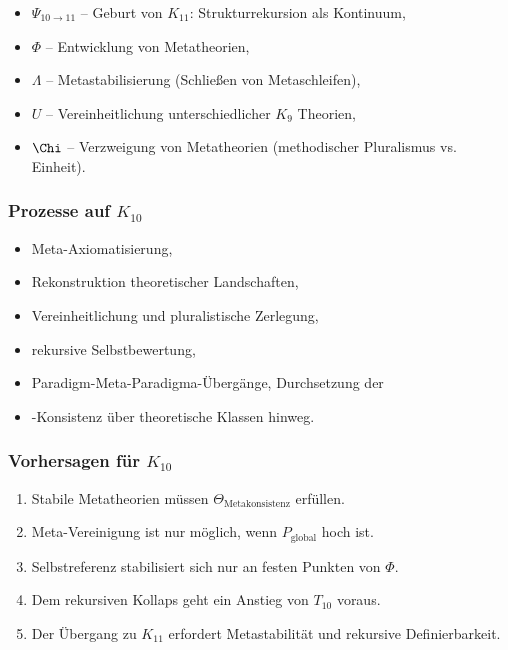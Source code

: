 \begin{itemize}
    \item $\Psi_{10\to11}$ – Geburt von $K_{11}$: Strukturrekursion als Kontinuum,
    \item $\Phi$ – Entwicklung von Metatheorien,
    \item $\Lambda$ – Metastabilisierung (Schließen von Metaschleifen),
    \item $U$ – Vereinheitlichung unterschiedlicher $K_9$ Theorien,
    \item $\Chi$ – Verzweigung von Metatheorien (methodischer Pluralismus vs. Einheit).
\end{itemize}

\subsubsection{Prozesse auf $K_{10}$}

\begin{itemize}
    \item Meta-Axiomatisierung,
    \item Rekonstruktion theoretischer Landschaften,
    \item Vereinheitlichung und pluralistische Zerlegung,
    \item rekursive Selbstbewertung,
    \item Paradigm-Meta-Paradigma-Übergänge,
    Durchsetzung der \item-Konsistenz über theoretische Klassen hinweg.
\end{itemize}

\subsubsection{Vorhersagen für $K_{10}$}

\begin{enumerate}
    \item Stabile Metatheorien müssen $\Theta_{\mathrm{Metakonsistenz}}$ erfüllen.
    \item Meta-Vereinigung ist nur möglich, wenn $P_{\mathrm{global}}$ hoch ist.
    \item Selbstreferenz stabilisiert sich nur an festen Punkten von $\Phi$.
    \item Dem rekursiven Kollaps geht ein Anstieg von $T_{10}$ voraus.
    \item Der Übergang zu $K_{11}$ erfordert Metastabilität und rekursive Definierbarkeit.
\end{enumerate}

